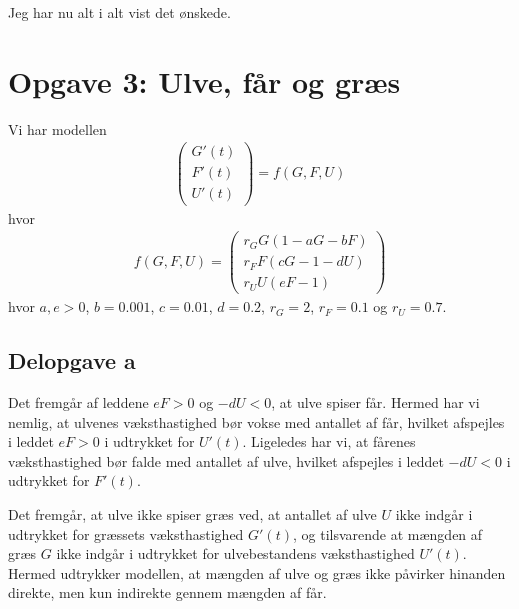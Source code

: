 \documentclass[12pt]{article}
\begin{document}
Jeg har nu alt i alt vist det ønskede.

\section{Opgave 3: Ulve, får og græs}

Vi har modellen
\begin{align}
\begin{pmatrix}
G'(t) \\ 
F'(t) \\
U'(t)
\end{pmatrix} = f(G, F, U)
\end{align}
hvor 
\begin{align}
f(G, F, U) = \begin{pmatrix}
r_G G (1 - a G - bF) \\ 
r_F F (cG - 1 - dU) \\
r_U U (eF - 1)
\end{pmatrix}
\end{align}
hvor $a, e>0$, $b=0.001$, $c=0.01$, $d=0.2$, $r_G = 2$, $r_F=0.1$ og $r_U=0.7$.

\subsection{Delopgave a}

Det fremgår af leddene $eF>0$ og $-dU<0$, at ulve spiser får. Hermed har vi nemlig, at ulvenes væksthastighed bør vokse med antallet af får, hvilket afspejles i leddet $eF>0$ i udtrykket for $U'(t)$. Ligeledes har vi, at fårenes væksthastighed bør falde med antallet af ulve, hvilket afspejles i leddet $-dU<0$ i udtrykket for $F'(t)$. 

Det fremgår, at ulve ikke spiser græs ved, at antallet af ulve $U$ ikke indgår i udtrykket for græssets væksthastighed $G'(t)$, og tilsvarende at mængden af græs $G$ ikke indgår i udtrykket for ulvebestandens væksthastighed $U'(t)$. Hermed udtrykker modellen, at mængden af ulve og græs ikke  påvirker hinanden direkte, men kun indirekte gennem mængden af får. 
\end{document}
